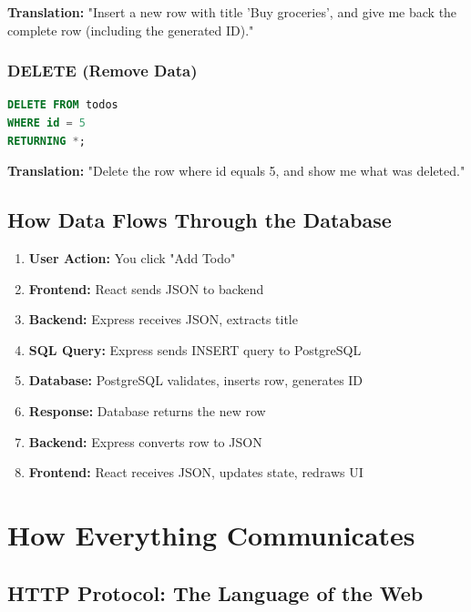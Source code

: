 \documentclass[12pt,a4paper]{article}
\begin{document}
\textbf{Translation:} "Insert a new row with title 'Buy groceries', and give me back the complete row (including the generated ID)."

\subsubsection{DELETE (Remove Data)}

\begin{lstlisting}[language=SQL, caption=Delete a todo]
DELETE FROM todos 
WHERE id = 5 
RETURNING *;
\end{lstlisting}

\textbf{Translation:} "Delete the row where id equals 5, and show me what was deleted."

\subsection{How Data Flows Through the Database}

\begin{enumerate}
    \item \textbf{User Action:} You click "Add Todo"
    \item \textbf{Frontend:} React sends JSON to backend
    \item \textbf{Backend:} Express receives JSON, extracts title
    \item \textbf{SQL Query:} Express sends INSERT query to PostgreSQL
    \item \textbf{Database:} PostgreSQL validates, inserts row, generates ID
    \item \textbf{Response:} Database returns the new row
    \item \textbf{Backend:} Express converts row to JSON
    \item \textbf{Frontend:} React receives JSON, updates state, redraws UI
\end{enumerate}

\section{How Everything Communicates}

\subsection{HTTP Protocol: The Language of the Web}
\end{document}
